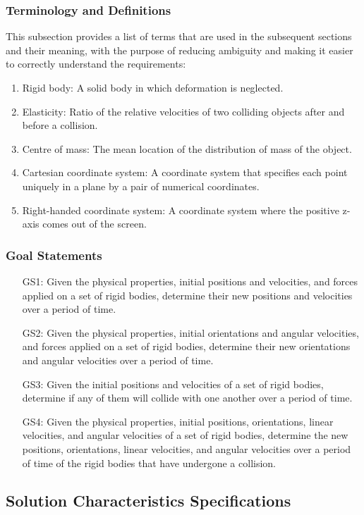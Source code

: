 \documentclass[12pt]{article}
\begin{document}
\subsubsection{Terminology and Definitions}
\label{Sec:TermandDefi}
This subsection provides a list of terms that are used in the subsequent sections and their meaning, with the purpose of reducing ambiguity and making it easier to correctly understand the requirements:
\begin{enumerate}
\item{Rigid body: A solid body in which deformation is neglected.}
\item{Elasticity: Ratio of the relative velocities of two colliding objects after and before a collision.}
\item{Centre of mass: The mean location of the distribution of mass of the object.}
\item{Cartesian coordinate system: A coordinate system that specifies each point uniquely in a plane by a pair of numerical coordinates.}
\item{Right-handed coordinate system: A coordinate system where the positive z-axis comes out of the screen.}
\end{enumerate}
\subsubsection{Goal Statements}
\label{Sec:GoalStat}
\begin{itemize}
\item[GS1:]Given the physical properties, initial positions and velocities, and forces applied on a set of rigid bodies, determine their new positions and velocities over a period of time.
\item[GS2:]Given the physical properties, initial orientations and angular velocities, and forces applied on a set of rigid bodies, determine their new orientations and angular velocities over a period of time.
\item[GS3:]Given the initial positions and velocities of a set of rigid bodies, determine if any of them will collide with one another over a period of time.
\item[GS4:]Given the physical properties, initial positions, orientations, linear velocities, and angular velocities of a set of rigid bodies, determine the new positions, orientations, linear velocities, and angular velocities over a period of time of the rigid bodies that have undergone a collision.
\end{itemize}
\subsection{Solution Characteristics Specifications}
\label{Sec:SoluCharSpec}
\end{document}
